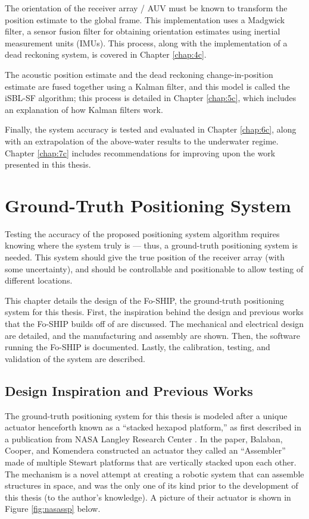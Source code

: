 \documentclass[11pt]{ucthesisCP}
\begin{document}
The orientation of the receiver array / AUV must be known to transform the position estimate to the global frame. This implementation uses a Madgwick filter, a sensor fusion filter for obtaining orientation estimates using inertial measurement units (IMUs). This process, along with the implementation of a dead reckoning system, is covered in Chapter \ref{chap:4c}.

The acoustic position estimate and the dead reckoning change-in-position estimate are fused together using a Kalman filter, and this model is called the iSBL-SF algorithm; this process is detailed in Chapter \ref{chap:5c}, which includes an explanation of how Kalman filters work.

Finally, the system accuracy is tested and evaluated in Chapter \ref{chap:6c}, along with an extrapolation of the above-water results to the underwater regime. Chapter \ref{chap:7c} includes recommendations for improving upon the work presented in this thesis.











\chapter{Ground-Truth Positioning System} \label{chap:2c}
Testing the accuracy of the proposed positioning system algorithm requires knowing where the system truly is --- thus, a ground-truth positioning system is needed. This system should give the true position of the receiver array (with some uncertainty), and should be controllable and positionable to allow testing of different locations. 

This chapter details the design of the Fo-SHIP, the ground-truth positioning system for this thesis. First, the inspiration behind the design and previous works that the Fo-SHIP builds off of are discussed. The mechanical and electrical design are detailed, and the manufacturing and assembly are shown. Then, the software running the Fo-SHIP is documented. Lastly, the calibration, testing, and validation of the system are described.

\section{Design Inspiration and Previous Works} \label{sec:2s1}
The ground-truth positioning system for this thesis is modeled after a unique actuator henceforth known as a “stacked hexapod platform,” as first described in a publication from NASA Langley Research Center \cite{nasaSSPpaper}. In the paper, Balaban, Cooper, and Komendera constructed an actuator they called an “Assembler” made of multiple Stewart platforms that are vertically stacked upon each other. The mechanism is a novel attempt at creating a robotic system that can assemble structures in space, and was the only one of its kind prior to the development of this thesis (to the author's knowledge). A picture of their actuator is shown in Figure \ref{fig:nasassp} below.
\end{document}
